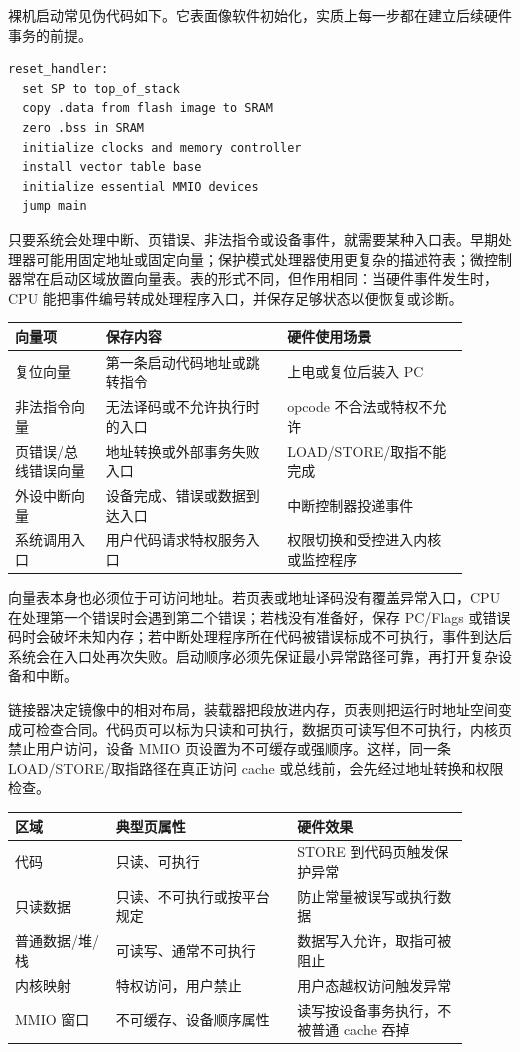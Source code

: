 裸机启动常见伪代码如下。它表面像软件初始化，实质上每一步都在建立后续硬件事务的前提。

\begin{lstlisting}
reset_handler:
  set SP to top_of_stack
  copy .data from flash image to SRAM
  zero .bss in SRAM
  initialize clocks and memory controller
  install vector table base
  initialize essential MMIO devices
  jump main
\end{lstlisting}

只要系统会处理中断、页错误、非法指令或设备事件，就需要某种入口表。早期处理器可能用固定地址或固定向量；保护模式处理器使用更复杂的描述符表；微控制器常在启动区域放置向量表。表的形式不同，但作用相同：当硬件事件发生时，CPU 能把事件编号转成处理程序入口，并保存足够状态以便恢复或诊断。

\begin{longtable}{L{0.18\linewidth}L{0.36\linewidth}L{0.36\linewidth}}
\toprule
向量项 & 保存内容 & 硬件使用场景 \\
\midrule
复位向量 & 第一条启动代码地址或跳转指令 & 上电或复位后装入 PC \\
非法指令向量 & 无法译码或不允许执行时的入口 & opcode 不合法或特权不允许 \\
页错误/总线错误向量 & 地址转换或外部事务失败入口 & LOAD/STORE/取指不能完成 \\
外设中断向量 & 设备完成、错误或数据到达入口 & 中断控制器投递事件 \\
系统调用入口 & 用户代码请求特权服务入口 & 权限切换和受控进入内核或监控程序 \\
\bottomrule
\end{longtable}

向量表本身也必须位于可访问地址。若页表或地址译码没有覆盖异常入口，CPU 在处理第一个错误时会遇到第二个错误；若栈没有准备好，保存 PC/Flags 或错误码时会破坏未知内存；若中断处理程序所在代码被错误标成不可执行，事件到达后系统会在入口处再次失败。启动顺序必须先保证最小异常路径可靠，再打开复杂设备和中断。

链接器决定镜像中的相对布局，装载器把段放进内存，页表则把运行时地址空间变成可检查合同。代码页可以标为只读和可执行，数据页可读写但不可执行，内核页禁止用户访问，设备 MMIO 页设置为不可缓存或强顺序。这样，同一条 LOAD/STORE/取指路径在真正访问 cache 或总线前，会先经过地址转换和权限检查。

\begin{longtable}{L{0.2\linewidth}L{0.36\linewidth}L{0.34\linewidth}}
\toprule
区域 & 典型页属性 & 硬件效果 \\
\midrule
代码 & 只读、可执行 & STORE 到代码页触发保护异常 \\
只读数据 & 只读、不可执行或按平台规定 & 防止常量被误写或执行数据 \\
普通数据/堆/栈 & 可读写、通常不可执行 & 数据写入允许，取指可被阻止 \\
内核映射 & 特权访问，用户禁止 & 用户态越权访问触发异常 \\
MMIO 窗口 & 不可缓存、设备顺序属性 & 读写按设备事务执行，不被普通 cache 吞掉 \\
\bottomrule
\end{longtable}

